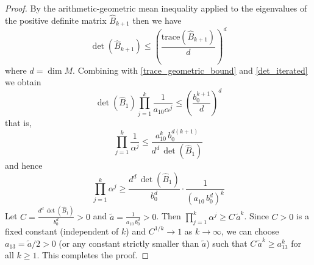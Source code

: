 \documentclass[12pt,a4paper,draft]{article}  %
\theoremstyle{definition}
\numberwithin{equation}{section}
\begin{document}
\begin{proof}
        By the arithmetic-geometric mean inequality applied to the eigenvalues of the positive definite matrix $\hat{B}_{k+1}$ then we have
        \[
        \det(\hat{B}_{k+1}) \leq \left(\frac{\mathrm{trace}(\hat{B}_{k+1})}{d}\right)^d
        \]
        where $d = \dim M$. Combining with \eqref{trace_geometric_bound} and \eqref{det_iterated} we obtain
        \[
        \det(\hat{B}_1)\prod_{j=1}^{k}\frac{1}{a_{10}\alpha^j} \leq \left(\frac{b_0^{k+1}}{d}\right)^d
        \]
        that is,
        \[
        \prod_{j=1}^k \frac{1}{\alpha^j} \leq \frac{a_{10}^k\,b_0^{d(k+1)}}{d^d\,\det(\hat{B}_1)}
        \]
        and hence
        \[
        \prod_{j=1}^k \alpha^j \geq \frac{d^d\,\det(\hat{B}_1)}{b_0^d}\cdot\frac{1}{(a_{10}\,b_0^d)^k}
        \]
        Let $C = \frac{d^d\,\det(\hat{B}_1)}{b_0^d}>0$ and $\tilde{a} = \frac{1}{a_{10}\,b_0^d}>0$. Then $\prod_{j=1}^k\alpha^j \geq C\,\tilde{a}^k$. Since $C>0$ is a fixed constant (independent of $k$) and $C^{1/k}\to 1$ as $k\to\infty$, we can choose $a_{13} = \tilde{a}/2>0$ (or any constant strictly smaller than $\tilde{a}$) such that $C\,\tilde{a}^k \geq a_{13}^k$ for all $k\geq 1$. This completes the proof.
\end{proof}
\end{document}
